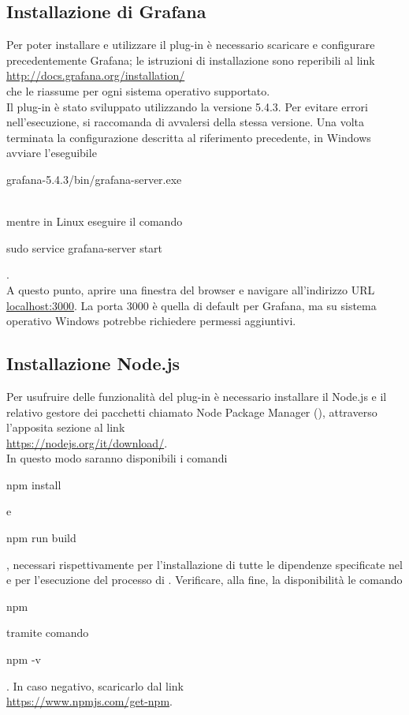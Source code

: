 \subsection{Installazione di Grafana}
Per poter installare e utilizzare il plug-in è necessario scaricare e configurare precedentemente Grafana; le istruzioni di installazione sono reperibili al link\\[0.2cm]
\hspace*{10mm}\url{http://docs.grafana.org/installation/} \\[0.2cm]
che le riassume per ogni sistema operativo supportato.\\
Il plug-in è stato sviluppato utilizzando la versione 5.4.3. Per evitare errori nell'esecuzione, si raccomanda di avvalersi della stessa versione.
Una volta terminata la configurazione descritta al riferimento precedente, in Windows avviare l'eseguibile\\[0.2cm]
\hspace*{10mm}\begin{ttfamily}grafana-5.4.3/bin/grafana-server.exe\end{ttfamily}\\[0.2cm] mentre in Linux eseguire il comando\\[0.2cm]
\hspace*{10mm}\begin{ttfamily}sudo service grafana-server start\end{ttfamily}.\\[0.2cm]
A questo punto, aprire una finestra del browser e navigare all'indirizzo URL \url{localhost:3000}. La porta 3000 è quella di default per Grafana, ma su sistema operativo Windows potrebbe richiedere permessi aggiuntivi.
\subsection{Installazione Node.js}
Per usufruire delle funzionalità del plug-in è necessario installare il  Node.js e il relativo gestore dei pacchetti chiamato Node Package Manager (), attraverso l'apposita sezione al link\\[0.2cm]
\hspace*{10mm}\url{https://nodejs.org/it/download/}.\\[0.2cm] In questo modo saranno disponibili i comandi \begin{ttfamily}npm install\end{ttfamily} e \begin{ttfamily}npm run build\end{ttfamily}, necessari rispettivamente per l'installazione di tutte le dipendenze specificate nel  e per l'esecuzione del processo di .
Verificare, alla fine, la disponibilità le comando \begin{ttfamily}npm\end{ttfamily} tramite comando \begin{ttfamily}npm -v\end{ttfamily}. In caso negativo, scaricarlo dal link \\[0.2cm]
\hspace*{10mm}\url{https://www.npmjs.com/get-npm}.


